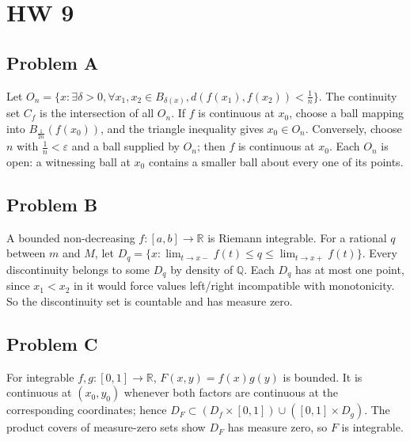 \chapter{HW 9}

\section{Problem A}

Let \(O_{n} = \{ x:\exists\delta > 0,\forall x_{1},x_{2} \in B_{\delta{(x)}},d\left( {f\left( x_{1} \right),f\left( x_{2} \right)} \right) < \frac{1}{n}\}\). The continuity set \(C_{f}\) is the intersection of all \(O_{n}\). If \(f\) is continuous at \(x_{0}\), choose a ball mapping into \(B_{\frac{1}{2n}}\left( {f\left( x_{0} \right)} \right)\), and the triangle inequality gives \(x_{0} \in O_{n}\). Conversely, choose \(n\) with \(\frac{1}{n} < \varepsilon\) and a ball supplied by \(O_{n}\); then \(f\) is continuous at \(x_{0}\). Each \(O_{n}\) is open: a witnessing ball at \(x_{0}\) contains a smaller ball about every one of its points.

\section{Problem B}

A bounded non-decreasing \(f:\left\lbrack {a,b} \right\rbrack\rightarrow\mathbb{R}\) is Riemann integrable. For a rational \(q\) between \(m\) and \(M\), let \(D_{q} = \{ x:\lim_{t\rightarrow x -}f(t) \leq q \leq \lim_{t\rightarrow x +}f(t)\}\). Every discontinuity belongs to some \(D_{q}\) by density of \(\mathbb{Q}\). Each \(D_{q}\) has at most one point, since \(x_{1} < x_{2}\) in it would force values left/right incompatible with monotonicity. So the discontinuity set is countable and has measure zero.

\section{Problem C}

For integrable \(f,g:\left\lbrack {0,1} \right\rbrack\rightarrow\mathbb{R}\), \(F\left( {x,y} \right) = f(x)g(y)\) is bounded. It is continuous at \(\left( {x_{0},y_{0}} \right)\) whenever both factors are continuous at the corresponding coordinates; hence \(D_{F} \subset \left( {D_{f} \times \left\lbrack {0,1} \right\rbrack} \right) \cup \left( {\left\lbrack {0,1} \right\rbrack \times D_{g}} \right)\). The product covers of measure-zero sets show \(D_{F}\) has measure zero, so \(F\) is integrable.

